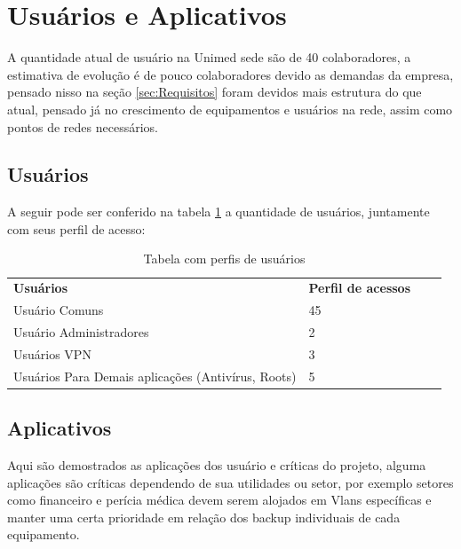\documentclass[	DIV=calc,%
							paper=a4,%
							fontsize=12pt,%
							onecolumn]{scrartcl}	 					%
\begin{document}
\section{Usuários e Aplicativos}
A quantidade atual de usuário na Unimed sede são de 40 colaboradores, a estimativa de evolução é de pouco colaboradores devido as demandas da empresa, pensado nisso na seção \ref{sec:Requisitos} foram devidos mais estrutura do que atual, pensado já no crescimento de equipamentos e usuários na rede, assim como pontos de redes necessários. 

\subsection{Usuários}
	A seguir pode ser conferido na tabela \ref{tab:usuarios} a quantidade de usuários, juntamente com seus perfil de acesso:
	\begin{table}[!htbp]
		\centering
		\begin{tabular}{|l|l|ll} 
			\cline{1-2}
			\textbf{Usuários}                                  & \textbf{Perfil de acessos} &  &   \\ 
			\cline{1-2}
			Usuário Comuns                                     & 45                         &  &   \\
			Usuário Administradores                            & 2                          &  &   \\
			Usuários VPN                                       & 3                          &  &   \\
			Usuários Para Demais aplicações (Antivírus, Roots) & 5                          &  &   \\
			\cline{1-2}
		\end{tabular}
		\caption{Tabela com perfis de usuários}\label{tab:usuarios}
	\end{table}

\subsection{Aplicativos}
Aqui são demostrados as aplicações dos usuário e críticas do projeto, alguma aplicações são críticas dependendo de sua utilidades ou setor, por exemplo setores como financeiro e perícia médica devem serem alojados em Vlans específicas e manter uma certa prioridade em relação dos backup individuais de cada equipamento. 
\end{document}
